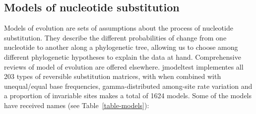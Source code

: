 \documentclass[11pt,twoside,a4paper]{article}
\begin{document}
\subsection{Models of nucleotide substitution}

Models of evolution are sets of assumptions about the process of nucleotide substitution. They describe the different probabilities of change from one nucleotide to another along a phylogenetic tree, allowing us to choose among different phylogenetic hypotheses to explain the data at hand. Comprehensive reviews of model of evolution are offered elsewhere. jmodeltest implementes all 203 types of reversible substitution matrices, with when combined with unequal/equal base frequencies, gamma-distributed among-site rate variation and a proportion of invariable sites makes a total of 1624 models. Some of the models have received names (see Table~\ref{table-models}):
\end{document}
